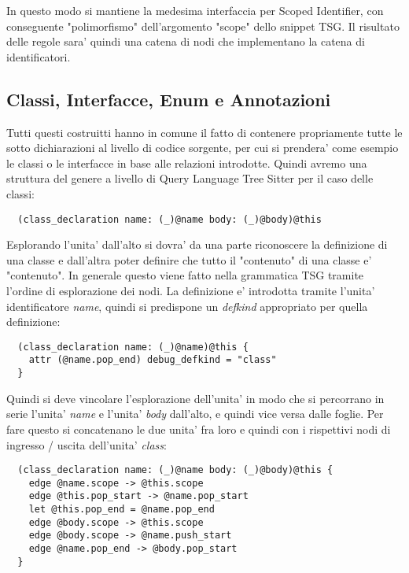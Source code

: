 
In questo modo si mantiene la medesima interfaccia per Scoped Identifier, con conseguente "polimorfismo" dell'argomento "scope" dello snippet TSG. Il risultato delle regole sara' quindi una catena di nodi che implementano la catena di identificatori.

\subsection{Classi, Interfacce, Enum e Annotazioni}

Tutti questi costruitti hanno in comune il fatto di contenere propriamente tutte le sotto dichiarazioni al livello di codice sorgente, per cui si prendera' come esempio le classi o le interfacce in base alle relazioni introdotte.
Quindi avremo una struttura del genere a livello di Query Language Tree Sitter per il caso delle classi:

\begin{lstlisting}
  (class_declaration name: (_)@name body: (_)@body)@this
\end{lstlisting}

Esplorando l'unita' dall'alto si dovra' da una parte riconoscere la definizione di una classe e dall'altra poter definire che tutto il "contenuto" di una classe e' "contenuto".
In generale questo viene fatto nella grammatica TSG tramite l'ordine di esplorazione dei nodi.
La definizione e' introdotta tramite l'unita' identificatore \emph{name}, quindi si predispone un \emph{defkind} appropriato per quella definizione:

\begin{lstlisting}
  (class_declaration name: (_)@name)@this {
    attr (@name.pop_end) debug_defkind = "class"
  }
\end{lstlisting}

Quindi si deve vincolare l'esplorazione dell'unita' in modo che si percorrano in serie l'unita' \emph{name} e l'unita' \emph{body} dall'alto, e quindi vice versa dalle foglie.
Per fare questo si concatenano le due unita' fra loro e quindi con i rispettivi nodi di ingresso / uscita dell'unita' \emph{class}: 

\begin{lstlisting}
  (class_declaration name: (_)@name body: (_)@body)@this {
    edge @name.scope -> @this.scope
    edge @this.pop_start -> @name.pop_start
    let @this.pop_end = @name.pop_end
    edge @body.scope -> @this.scope
    edge @body.scope -> @name.push_start
    edge @name.pop_end -> @body.pop_start
  }
\end{lstlisting}

